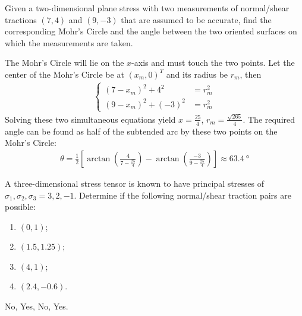\begin{Exercise}
Given a two-dimensional plane stress with two measurements of normal/shear tractions $(7,4)$ and $(9,-3)$ that are assumed to be accurate, find the corresponding Mohr's Circle and the angle between the two oriented surfaces on which the measurements are taken.
\end{Exercise}
\begin{Answer}
The Mohr's Circle will lie on the $x$-axis and must touch the two points. Let the center of the Mohr's Circle be at $(x_m,0)^T$ and its radius be $r_m$, then
\begin{align*}
\left\{\begin{alignedat}{1}
(7-x_m)^2 + 4^2 &= r_m^2 \\
(9-x_m)^2 + (-3)^2 &= r_m^2 
\end{alignedat}\right.    
\end{align*}
Solving these two simultaneous equations yield $x = \frac{25}{4}$, $r_m = \frac{\sqrt{265}}{4}$. The required angle can be found as half of the subtended arc by these two points on the Mohr's Circle:
\begin{align*}
\theta = \frac{1}{2} \left[\arctan(\frac{4}{7-\frac{25}{4}}) - \arctan(\frac{-3}{9-\frac{25}{4}})\right] \approx \SI{63.4}{\degree}
\end{align*}
\end{Answer}

\begin{Exercise}
A three-dimensional stress tensor is known to have principal stresses of $\sigma_1, \sigma_2, \sigma_3 = 3,2,-1$. Determine if the following normal/shear traction pairs are possible:
\begin{enumerate}[label=(\alph*)]
    \item $(0,1)$;
    \item $(1.5,1.25)$;
    \item $(4,1)$;
    \item $(2.4,-0.6)$.
\end{enumerate}
\end{Exercise}
\begin{Answer}
No, Yes, No, Yes.
\end{Answer}

